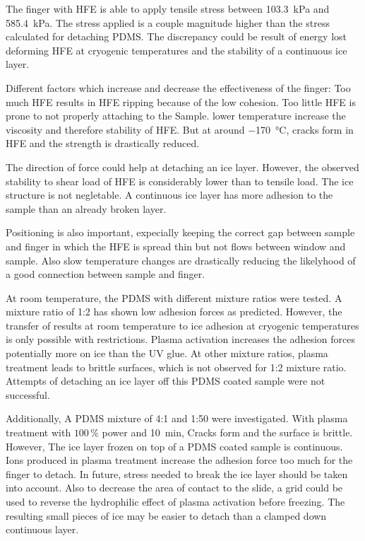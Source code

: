 

The finger with HFE is able to apply tensile stress between \SI{103.3}{\kilo\pascal} and \SI{585.4}{\kilo\pascal}. The stress applied is a couple magnitude higher than the stress calculated for detaching PDMS. The discrepancy could be result of energy lost deforming HFE at cryogenic temperatures and the stability of a continuous ice layer.

Different factors which increase and decrease the effectiveness of the finger: Too much HFE results in HFE ripping because of the low cohesion. Too little HFE is prone to not properly attaching to the Sample. lower temperature increase the viscosity and therefore stability of HFE. But at around \SI{-170}{\degreeCelsius}, cracks form in HFE and the strength is drastically reduced.

The direction of force could help at detaching an ice layer. However, the observed stability to shear load of HFE is considerably lower than to tensile load. The ice structure is not negletable. A continuous ice layer has more adhesion to the sample than an already broken layer. 

Positioning is also important, expecially keeping the correct gap between sample and finger in which the HFE is spread thin but not flows between window and sample. Also slow temperature changes are drastically reducing the likelyhood of a good connection between sample and finger.

At room temperature, the PDMS with different mixture ratios were tested. A mixture ratio of 1:2 has shown low adhesion forces as predicted. However, the transfer of results at room temperature to ice adhesion at cryogenic temperatures is only possible with restrictions. Plasma activation increases the adhesion forces potentially more on ice than the UV glue. At other mixture ratios, plasma treatment leads to brittle surfaces, which is not observed for 1:2 mixture ratio. Attempts of detaching an ice layer off this PDMS coated sample were not successful.

Additionally, A PDMS mixture of 4:1 and 1:50 were investigated. With plasma treatment with $100\,\%$ power and \SI{10}{\minute}, Cracks form and the surface is brittle. However, The ice layer frozen on top of a PDMS coated sample is continuous. Ions produced in plasma treatment increase the adhesion force too much for the finger to detach. In future, stress needed to break the ice layer should be taken into account. Also to decrease the area of contact to the slide, a grid could be used to reverse the hydrophilic effect of plasma activation before freezing. The resulting small pieces of ice may be easier to detach than a clamped down continuous layer.

